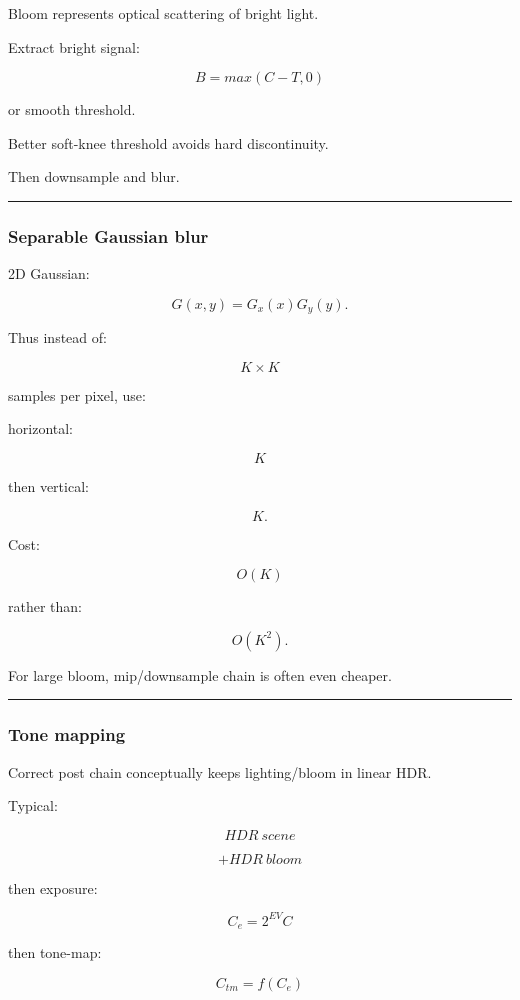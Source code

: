Bloom represents optical scattering of bright light.

Extract bright signal:

\[
B=
max(
C-T,
0
)
\]

or smooth threshold.

Better soft-knee threshold avoids hard discontinuity.

Then downsample and blur.

\begin{center}\rule{0.5\linewidth}{0.5pt}\end{center}

\subsubsection{Separable Gaussian blur}\label{separable-gaussian-blur}

2D Gaussian:

\[
G(x,y)
=
G_x(x)G_y(y).
\]

Thus instead of:

\[
K\times K
\]

samples per pixel, use:

horizontal:

\[
K
\]

then vertical:

\[
K.
\]

Cost:

\[
O(K)
\]

rather than:

\[
O(K^2).
\]

For large bloom, mip/downsample chain is often even cheaper.

\begin{center}\rule{0.5\linewidth}{0.5pt}\end{center}

\subsubsection{Tone mapping}\label{tone-mapping}

Correct post chain conceptually keeps lighting/bloom in linear HDR.

Typical:

\[
HDR\ scene
\]

\[
+
HDR\ bloom
\]

then exposure:

\[
C_e=
2^{EV}C
\]

then tone-map:

\[
C_{tm}=f(C_e)
\]

